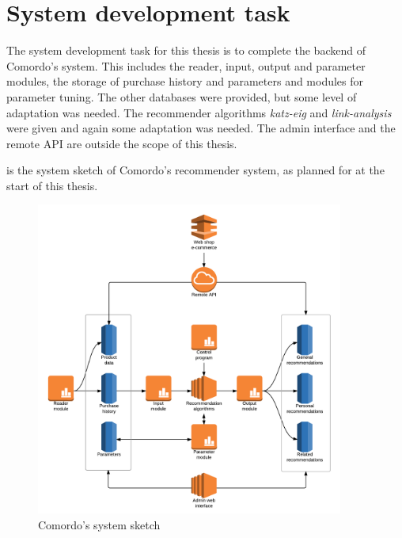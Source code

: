 
\section{System development task}\label{sec:task}

The system development task for this thesis is to complete the backend of Comordo's system. This includes the reader, input, output and parameter modules, the storage of purchase history and parameters and modules for parameter tuning. The other databases were provided, but some level of adaptation was needed. The recommender algorithms \textit{katz-eig} and \textit{link-analysis} were given and again some adaptation was needed. The admin interface and the remote API are outside the scope of this thesis.

 is the system sketch of Comordo's recommender system, as planned for at the start of this thesis.

\begin{figure}[h!]
  \centering
    \includegraphics[width=0.9\textwidth]{fig/system_overview.png}
  \caption{Comordo's system sketch}
  \label{fig:sysoverview}
\end{figure}

\FloatBarrier

